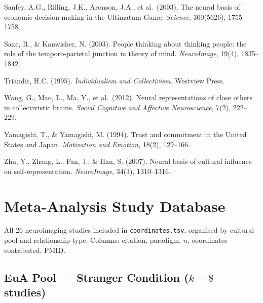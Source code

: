 \documentclass[11pt,a4paper]{report}
\begin{document}
\begin{small}
\medskip\noindent
Sanfey, A.G., Rilling, J.K., Aronson, J.A., et al.\ (2003). The neural basis of economic
decision-making in the Ultimatum Game. \textit{Science}, 300(5626), 1755--1758.

\medskip\noindent
Saxe, R., \& Kanwisher, N. (2003). People thinking about thinking people: the role of the
temporo-parietal junction in theory of mind. \textit{NeuroImage}, 19(4), 1835--1842.

\medskip\noindent
Triandis, H.C. (1995). \textit{Individualism and Collectivism}. Westview Press.

\medskip\noindent
Wang, G., Mao, L., Ma, Y., et al.\ (2012). Neural representations of close others in
collectivistic brains.
\textit{Social Cognitive and Affective Neuroscience}, 7(2), 222--229.

\medskip\noindent
Yamagishi, T., \& Yamagishi, M. (1994). Trust and commitment in the United States and Japan.
\textit{Motivation and Emotion}, 18(2), 129--166.

\medskip\noindent
Zhu, Y., Zhang, L., Fan, J., \& Han, S. (2007). Neural basis of cultural influence on
self-representation. \textit{NeuroImage}, 34(3), 1310--1316.
\end{small}

\appendix
\chapter{Meta-Analysis Study Database}

\noindent
All 26 neuroimaging studies included in \texttt{coordinates.tsv}, organised by cultural pool
and relationship type. Columns: citation, paradigm, $n$, coordinates contributed, PMID.

\section*{\textcolor{euaBlue}{EuA Pool --- Stranger Condition ($k=8$ studies)}}
\end{document}

